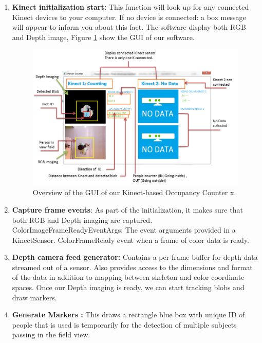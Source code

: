 \begin{enumerate}
  \item \textbf{Kinect initialization start:} This function will look up for any connected Kinect devices to your computer.  If no device is connected: a box message will appear to inform you about this fact.  The software display both RGB and Depth image,  Figure \ref{fig:guioverview} show the GUI of our software.

     \begin{figure}[!ht]
  \begin{center}
	  	\includegraphics[width=0.9\columnwidth]{./images/swm.png}
  \end{center}
  \caption{Overview of the GUI of our Kinect-based Occupancy Counter x.}
  \label{fig:guioverview}
\end{figure}
\item \textbf{Capture frame events}: As part of the initialization,  it makes sure that both RGB and Depth imaging are captured.
ColorImageFrameReadyEventArgs:	The event arguments provided in a KinectSensor. ColorFrameReady event when a frame of color data is ready.
\item \textbf{Depth camera feed generator:} Contains a per-frame buffer for depth data streamed out of a sensor.  Also provides access to the dimensions and format of the data in addition to mapping between skeleton and color coordinate spaces.  Once our Depth imaging is ready, we can start tracking blobs and draw markers.
\item \textbf{Generate Markers :} This draws a rectangle blue box  with unique ID of people that is used is temporarily  for the detection of multiple subjects passing in the field view.

\end{enumerate}


